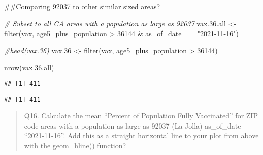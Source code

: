 \documentclass[
]{article}
\newenvironment{Shaded}{\begin{snugshade}}{\end{snugshade}}
\newcommand{\AttributeTok}[1]{\textcolor[rgb]{0.77,0.63,0.00}{#1}}
\newcommand{\CommentTok}[1]{\textcolor[rgb]{0.56,0.35,0.01}{\textit{#1}}}
\newcommand{\ConstantTok}[1]{\textcolor[rgb]{0.00,0.00,0.00}{#1}}
\newcommand{\DecValTok}[1]{\textcolor[rgb]{0.00,0.00,0.81}{#1}}
\newcommand{\FloatTok}[1]{\textcolor[rgb]{0.00,0.00,0.81}{#1}}
\newcommand{\FunctionTok}[1]{\textcolor[rgb]{0.00,0.00,0.00}{#1}}
\newcommand{\NormalTok}[1]{#1}
\newcommand{\OtherTok}[1]{\textcolor[rgb]{0.56,0.35,0.01}{#1}}
\newcommand{\SpecialCharTok}[1]{\textcolor[rgb]{0.00,0.00,0.00}{#1}}
\newcommand{\StringTok}[1]{\textcolor[rgb]{0.31,0.60,0.02}{#1}}
\begin{document}
\#\#Comparing 92037 to other similar sized areas?

\begin{Shaded}
\begin{Highlighting}[]
\CommentTok{\# Subset to all CA areas with a population as large as 92037}
\NormalTok{vax.}\FloatTok{36.}\NormalTok{all }\OtherTok{\textless{}{-}} \FunctionTok{filter}\NormalTok{(vax, age5\_plus\_population }\SpecialCharTok{\textgreater{}} \DecValTok{36144} \SpecialCharTok{\&}
\NormalTok{                as\_of\_date }\SpecialCharTok{==} \StringTok{"2021{-}11{-}16"}\NormalTok{)}

\CommentTok{\#head(vax.36)}
\NormalTok{vax}\FloatTok{.36} \OtherTok{\textless{}{-}} \FunctionTok{filter}\NormalTok{(vax, age5\_plus\_population }\SpecialCharTok{\textgreater{}} \DecValTok{36144}\NormalTok{)}
\end{Highlighting}
\end{Shaded}

\begin{Shaded}
\begin{Highlighting}[]
\FunctionTok{nrow}\NormalTok{(vax.}\FloatTok{36.}\NormalTok{all)}
\end{Highlighting}
\end{Shaded}

\begin{verbatim}
## [1] 411
\end{verbatim}

\begin{Shaded}
\end{Shaded}

\begin{verbatim}
## [1] 411
\end{verbatim}

\begin{quote}
Q16. Calculate the mean ``Percent of Population Fully Vaccinated'' for
ZIP code areas with a population as large as 92037 (La Jolla)
as\_of\_date ``2021-11-16''. Add this as a straight horizontal line to
your plot from above with the geom\_hline() function?
\end{quote}

\begin{Shaded}
\end{Shaded}
\end{document}
